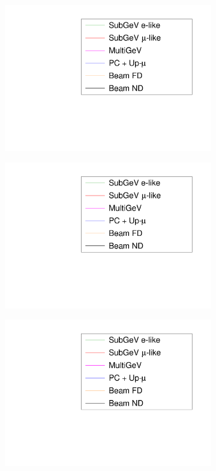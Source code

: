 \begin{figure}[h]
\begin{subfigure}[t]{0.5\textwidth}
    \includegraphics[width=\textwidth, trim={0mm 0mm 0mm 0mm}, clip,page=41]{Figures/OA/LLHScans_Systs.pdf}
  \end{subfigure}%
  \begin{subfigure}[t]{0.5\textwidth}
    \includegraphics[width=\textwidth, trim={0mm 0mm 0mm 0mm}, clip,page=43]{Figures/OA/LLHScans_Systs.pdf}
  \end{subfigure}
  \begin{subfigure}[t]{0.5\textwidth}
    \includegraphics[width=\textwidth, trim={0mm 0mm 0mm 0mm}, clip,page=1]{Figures/OA/LLHScans_Systs.pdf}

\end{subfigure}
\end{figure}
